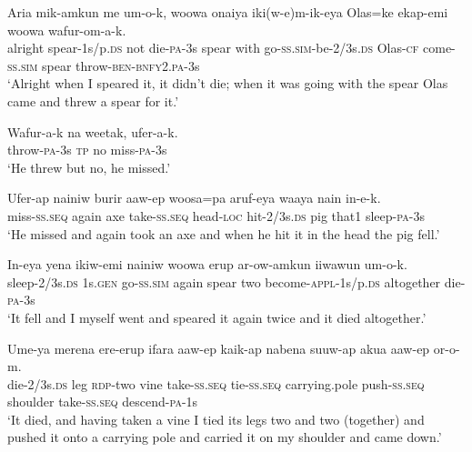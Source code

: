 \ea\label{ex:a:x20}
\gll  Aria  mik-amkun  me  um-o-k,  woowa  onaiya  iki(w-e)m-ik-eya       Olas=ke  ekap-emi  woowa  wafur-om-a-k. \\
alright  spear-1s/p.\textsc{ds}  not  die-\textsc{pa}-3s  spear  with  go-\textsc{ss}.\textsc{sim}-be-2/3s.\textsc{ds} Olas-\textsc{cf}  come-\textsc{ss}.\textsc{sim}  spear  throw-\textsc{ben}-\textsc{bnfy}2.\textsc{pa}-3s \\


\glt ‘Alright when I speared it, it didn’t die; when it was going with the spear Olas came and threw a spear for it.’ \\
\z


\ea\label{ex:a:x21}
\gll  Wafur-a-k  na  weetak,  ufer-a-k. \\
throw-\textsc{pa}-3s  \textsc{tp}  no  miss-\textsc{pa}-3s \\
\glt ‘He threw but no, he missed.’ \\
\z


\ea\label{ex:a:x22}
\gll  Ufer-ap  nainiw  burir  aaw-ep  woosa=pa  aruf-eya      waaya  nain  in-e-k. \\
miss-\textsc{ss.seq}  again  axe  take-\textsc{ss.seq}  head-\textsc{loc}  hit-2/3s.\textsc{ds}   pig  that1  sleep-\textsc{pa}-3s \\


\glt ‘He missed and again took an axe and when he hit it in the head the pig fell.’ \\
\z


\ea\label{ex:a:x23}
\gll  In-eya  yena  ikiw-emi  nainiw  woowa  erup  ar-ow-amkun           iiwawun  um-o-k. \\
sleep-2/3s.\textsc{ds}  1s.\textsc{gen}  go-\textsc{ss}.\textsc{sim}  again  spear  two  become-\textsc{appl}-1s/p.\textsc{ds} altogether  die-\textsc{pa}-3s \\


\glt ‘It fell and I myself went and speared it again twice and it died altogether.’ \\
\z


\ea\label{ex:a:x24}
\gll  Ume-ya  merena  ere-erup  ifara  aaw-ep  kaik-ap  nabena            suuw-ap  akua  aaw-ep  or-o-m. \\
die-2/3s.\textsc{ds}  leg  \textsc{rdp}-two  vine  take-\textsc{ss.seq}  tie-\textsc{ss.seq}  carrying.pole   push-\textsc{ss.seq}  shoulder  take-\textsc{ss.seq}  descend-\textsc{pa}-1s \\


\glt ‘It died, and having taken a vine I tied its legs two and two (together) and pushed it onto a carrying pole and carried it on my shoulder and came down.’ \\
\z


